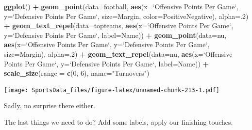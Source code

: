 \documentclass[]{book}
\newenvironment{Shaded}{\begin{snugshade}}{\end{snugshade}}
\newcommand{\DataTypeTok}[1]{\textcolor[rgb]{0.13,0.29,0.53}{#1}}
\newcommand{\DecValTok}[1]{\textcolor[rgb]{0.00,0.00,0.81}{#1}}
\newcommand{\KeywordTok}[1]{\textcolor[rgb]{0.13,0.29,0.53}{\textbf{#1}}}
\newcommand{\NormalTok}[1]{#1}
\newcommand{\OperatorTok}[1]{\textcolor[rgb]{0.81,0.36,0.00}{\textbf{#1}}}
\newcommand{\StringTok}[1]{\textcolor[rgb]{0.31,0.60,0.02}{#1}}
\begin{document}
\begin{Shaded}
\begin{Highlighting}[]
\KeywordTok{ggplot}\NormalTok{() }\OperatorTok{+}
\StringTok{  }\KeywordTok{geom_point}\NormalTok{(}\DataTypeTok{data=}\NormalTok{football, }\KeywordTok{aes}\NormalTok{(}\DataTypeTok{x=}\StringTok{`}\DataTypeTok{Offensive Points Per Game}\StringTok{`}\NormalTok{, }\DataTypeTok{y=}\StringTok{`}\DataTypeTok{Defensive Points Per Game}\StringTok{`}\NormalTok{, }\DataTypeTok{size=}\NormalTok{Margin, }\DataTypeTok{color=}\NormalTok{PositiveNegative), }\DataTypeTok{alpha=}\NormalTok{.}\DecValTok{2}\NormalTok{) }\OperatorTok{+}
\StringTok{  }\KeywordTok{geom_text_repel}\NormalTok{(}\DataTypeTok{data=}\NormalTok{topteams, }\KeywordTok{aes}\NormalTok{(}\DataTypeTok{x=}\StringTok{`}\DataTypeTok{Offensive Points Per Game}\StringTok{`}\NormalTok{, }\DataTypeTok{y=}\StringTok{`}\DataTypeTok{Defensive Points Per Game}\StringTok{`}\NormalTok{, }\DataTypeTok{label=}\NormalTok{Name)) }\OperatorTok{+}\StringTok{ }
\StringTok{  }\KeywordTok{geom_point}\NormalTok{(}\DataTypeTok{data=}\NormalTok{nu, }\KeywordTok{aes}\NormalTok{(}\DataTypeTok{x=}\StringTok{`}\DataTypeTok{Offensive Points Per Game}\StringTok{`}\NormalTok{, }\DataTypeTok{y=}\StringTok{`}\DataTypeTok{Defensive Points Per Game}\StringTok{`}\NormalTok{, }\DataTypeTok{size=}\NormalTok{Margin), }\DataTypeTok{alpha=}\NormalTok{.}\DecValTok{2}\NormalTok{) }\OperatorTok{+}
\StringTok{  }\KeywordTok{geom_text_repel}\NormalTok{(}\DataTypeTok{data=}\NormalTok{nu, }\KeywordTok{aes}\NormalTok{(}\DataTypeTok{x=}\StringTok{`}\DataTypeTok{Offensive Points Per Game}\StringTok{`}\NormalTok{, }\DataTypeTok{y=}\StringTok{`}\DataTypeTok{Defensive Points Per Game}\StringTok{`}\NormalTok{, }\DataTypeTok{label=}\NormalTok{Name)) }\OperatorTok{+}\StringTok{ }
\StringTok{  }\KeywordTok{scale_size}\NormalTok{(}\DataTypeTok{range =} \KeywordTok{c}\NormalTok{(}\DecValTok{0}\NormalTok{, }\DecValTok{6}\NormalTok{), }\DataTypeTok{name=}\StringTok{"Turnovers"}\NormalTok{)}
\end{Highlighting}
\end{Shaded}

\texttt{[image: SportsData\_files/figure-latex/unnamed-chunk-213-1.pdf]}

Sadly, no surprise there either.

The last things we need to do? Add some labels, apply our finishing touches.
\end{document}
